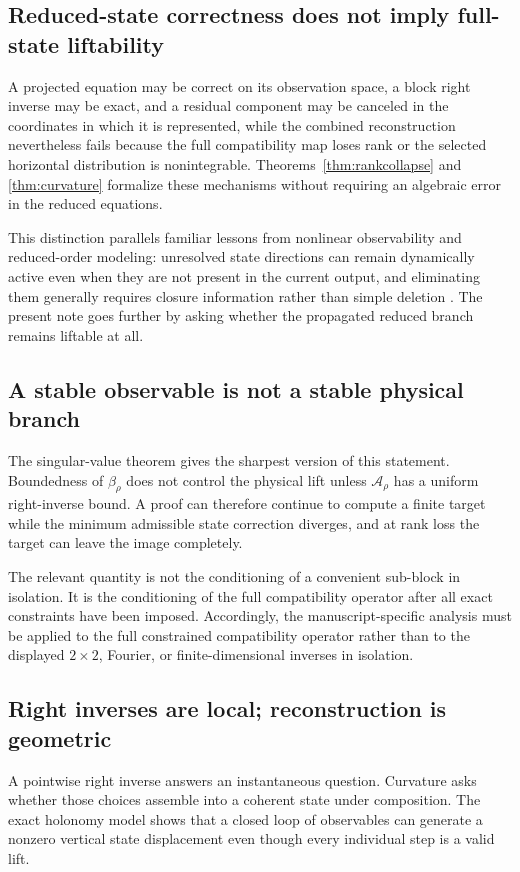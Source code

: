 \documentclass[12pt]{article}
\newcommand{\Comp}{\mathscr A}
\begin{document}
\subsection{Reduced-state correctness does not imply full-state liftability}
A projected equation may be correct on its observation space, a block right inverse may be exact, and a residual component may be canceled in the coordinates in which it is represented, while the combined reconstruction nevertheless fails because the full compatibility map loses rank or the selected horizontal distribution is nonintegrable. Theorems~\ref{thm:rankcollapse} and \ref{thm:curvature} formalize these mechanisms without requiring an algebraic error in the reduced equations.

This distinction parallels familiar lessons from nonlinear observability and reduced-order modeling: unresolved state directions can remain dynamically active even when they are not present in the current output, and eliminating them generally requires closure information rather than simple deletion \cite{HermannKrener,ChorinHaldKupferman}. The present note goes further by asking whether the propagated reduced branch remains liftable at all.

\subsection{A stable observable is not a stable physical branch}
The singular-value theorem gives the sharpest version of this statement. Boundedness of $\beta_\rho$ does not control the physical lift unless $\Comp_\rho$ has a uniform right-inverse bound. A proof can therefore continue to compute a finite target while the minimum admissible state correction diverges, and at rank loss the target can leave the image completely.

The relevant quantity is not the conditioning of a convenient sub-block in isolation. It is the conditioning of the full compatibility operator after all exact constraints have been imposed. Accordingly, the manuscript-specific analysis must be applied to the full constrained compatibility operator rather than to the displayed $2\times2$, Fourier, or finite-dimensional inverses in isolation.

\subsection{Right inverses are local; reconstruction is geometric}
A pointwise right inverse answers an instantaneous question. Curvature asks whether those choices assemble into a coherent state under composition. The exact holonomy model shows that a closed loop of observables can generate a nonzero vertical state displacement even though every individual step is a valid lift.
\end{document}
